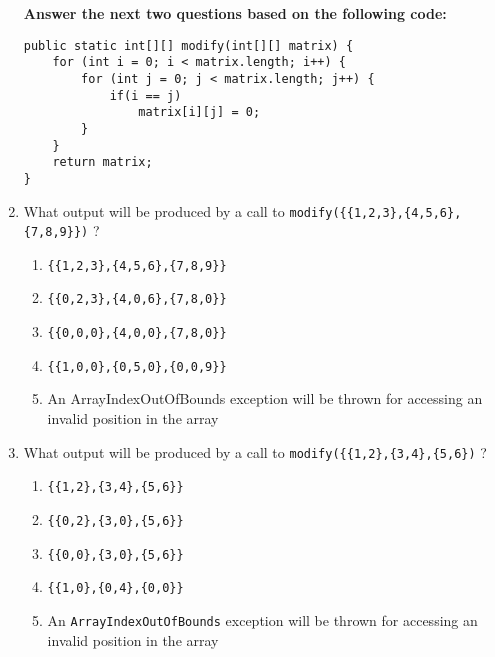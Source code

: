 \documentclass[CS180-S16-FinalExam.tex]{subfiles}
\begin{document}
\begin{enumerate}

\textbf{Answer the next two questions based on the following code:}
\begin{lstlisting}
public static int[][] modify(int[][] matrix) {
	for (int i = 0; i < matrix.length; i++) {
    	for (int j = 0; j < matrix.length; j++) {
        	if(i == j)
        		matrix[i][j] = 0;
        }
    }
    return matrix;
}
\end{lstlisting}
\item What output will be produced by a call to \texttt{modify(\{\{1,2,3\},\{4,5,6\},\{7,8,9\}\})} ?
\begin{enumerate}
\item \texttt{\{\{1,2,3\},\{4,5,6\},\{7,8,9\}\}}
\item \texttt{\{\{0,2,3\},\{4,0,6\},\{7,8,0\}\}} \ifdraft \Ans \fi
\item \texttt{\{\{0,0,0\},\{4,0,0\},\{7,8,0\}\}}
\item \texttt{\{\{1,0,0\},\{0,5,0\},\{0,0,9\}\}}
\item An ArrayIndexOutOfBounds exception will be thrown for accessing an invalid position in the array
\end{enumerate}

\clearpage
\item What output will be produced by a call to \texttt{modify(\{\{1,2\},\{3,4\},\{5,6\})} ?
\begin{enumerate}
\item \texttt{\{\{1,2\},\{3,4\},\{5,6\}\}}
\item \texttt{\{\{0,2\},\{3,0\},\{5,6\}\}}
\item \texttt{\{\{0,0\},\{3,0\},\{5,6\}\}}
\item \texttt{\{\{1,0\},\{0,4\},\{0,0\}\}}
\item An \texttt{ArrayIndexOutOfBounds} exception will be thrown for accessing an invalid position in the array \ifdraft \Ans \fi
\end{enumerate}


\end{enumerate}
\end{document}
